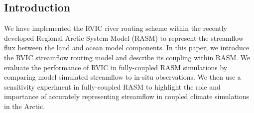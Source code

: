 \documentclass[jgrga, draft]{agutex}
\begin{document}
%

\begin{article}

%
%

\section{Introduction}

We have implemented the RVIC river routing scheme within the recently developed Regional Arctic System Model (RASM) \citep{Hamman_2016} to represent the streamflow flux between the land and ocean model components.
In this paper, we introduce the RVIC streamflow routing model and describe its coupling within RASM.
We evaluate the performance of RVIC in fully-coupled RASM simulations by comparing model simulated streamflow to in-situ observations.
We then use a sensitivity experiment in fully-coupled RASM to highlight the role and importance of accurately representing streamflow in coupled climate simulations in the Arctic.


\end{article}
\end{document}
